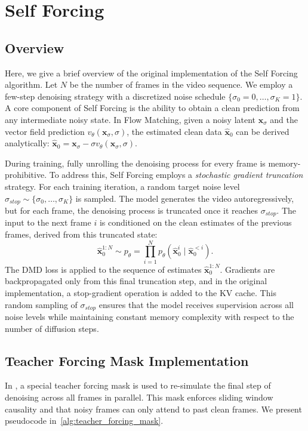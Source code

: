 \section{Self Forcing}

\subsection{Overview}
\label{subsec:sf_overview}

Here, we give a brief overview of the original implementation of the Self Forcing algorithm. Let $N$ be the number of frames in the video sequence. We employ a few-step denoising strategy with a discretized noise schedule $\{\sigma_0=0, \dots, \sigma_K=1\}$. 
A core component of Self Forcing is the ability to obtain a clean prediction from any intermediate noisy state. In Flow Matching, given a noisy latent $\mathbf{x}_{\sigma}$ and the vector field prediction $v_\theta(\mathbf{x}_{\sigma}, \sigma)$, the estimated clean data $\hat{\mathbf{x}}_0$ can be derived analytically: $\hat{\mathbf{x}}_0 = \mathbf{x}_{\sigma} - \sigma v_\theta(\mathbf{x}_{\sigma}, \sigma)$.

During training, fully unrolling the denoising process for every frame is memory-prohibitive. To address this, Self Forcing employs a \textit{stochastic gradient truncation} strategy. For each training iteration, a random target noise level $\sigma_{stop} \sim \{\sigma_0, \dots, \sigma_K\}$ is sampled. The model generates the video autoregressively, but for each frame, the denoising process is truncated once it reaches $\sigma_{stop}$. The input to the next frame $i$ is conditioned on the clean estimates of the previous frames, derived from this truncated state:
\[ \hat{\mathbf{x}}_0^{1:N} \sim p_{\theta} = \prod_{i=1}^N p_{\theta}(\hat{\mathbf{x}}_0^i \mid \hat{\mathbf{x}}_0^{<i}). \]
The DMD loss is applied to the sequence of estimates $\hat{\mathbf{x}}_0^{1:N}$. Gradients are backpropagated only from this final truncation step, and in the original implementation, a stop-gradient operation is added to the KV cache. This random sampling of $\sigma_{stop}$ ensures that the model receives supervision across all noise levels while maintaining constant memory complexity with respect to the number of diffusion steps.

\subsection{Teacher Forcing Mask Implementation}
\label{subsec:teacher_forcing_mask}


In \oursf, a special teacher forcing mask is used to re-simulate the final step of denoising across all frames in parallel. This mask enforces sliding window causality and that noisy frames can only attend to past clean frames. We present pseudocode in~\cref{alg:teacher_forcing_mask}. 


